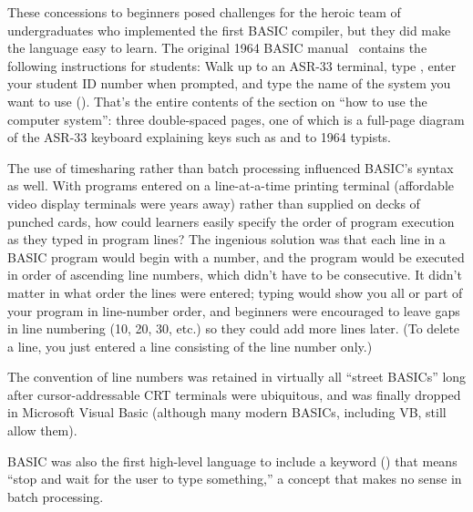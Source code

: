 These concessions to beginners posed challenges for the heroic team of
undergraduates who implemented the first BASIC compiler,
but they did make the language easy to learn.
The original 1964 BASIC manual~\cite[p. 14]{dartmouth_basic_manual}
contains the following instructions for students:
Walk up to an ASR-33 terminal, type , enter your student ID
number when prompted, and type the name of the system you want to use
().
That's the entire contents of the section on ``how to use the computer
system'': three double-spaced pages, one of which is a full-page diagram of the ASR-33
keyboard explaining keys such as  and  to 1964
typists.


The use of timesharing rather than batch processing influenced
BASIC's syntax as well.
With programs entered on a line-at-a-time printing terminal
(affordable video display
terminals were years away) rather than supplied on decks of punched
cards, how could learners easily specify the order of program execution
as they typed in program lines?
The ingenious solution was that each line in a BASIC
program would begin with a number, and the program would be
executed in order of ascending line numbers, which didn't have to be
consecutive.  
It didn't matter in what order the lines were entered;
typing  would show
you all or part of your program in line-number order,
and beginners were encouraged to leave gaps in line
numbering (10, 20, 30, etc.) so they could add
more lines later.  (To delete a line, you just entered a line
consisting of the line number only.)

  \begin{tangent}
  The convention of line numbers was retained in virtually all ``street
  BASICs'' long after cursor-addressable CRT terminals were ubiquitous,
  and was finally dropped in Microsoft Visual Basic (although many modern
  BASICs, including VB, still allow them).
  \end{tangent}

BASIC was also the first high-level language to include a keyword
() that means ``stop and wait for
the user to type something,'' a concept that makes no sense in batch
processing. 


